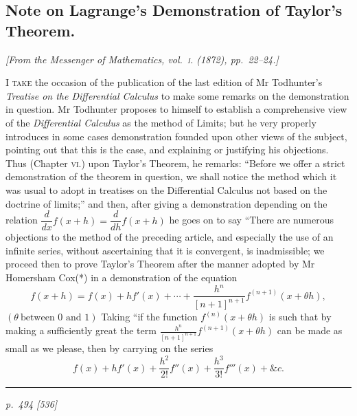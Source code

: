 \documentclass[11pt,a4paper]{article}
\theoremstyle{plain}
\theoremstyle{definition}
\begin{document}
\subsection{Note on Lagrange's Demonstration of Taylor's Theorem.}

\begin{center}
\textit{[From the Messenger of Mathematics, vol.~\textsc{i}. (1872), pp.~22--24.]}
\end{center}

\noindent\textsc{I take} the occasion of the publication of the last edition of Mr Todhunter's
\textit{Treatise on the Differential Calculus} to make some remarks on the demonstration in
question. Mr Todhunter proposes to himself to establish a comprehensive view of the
\textit{Differential Calculus} as the method of Limits; but he very properly introduces in some
cases demonstration founded upon other views of the subject, pointing out that this
is the case, and explaining or justifying his objections. Thus (Chapter \textsc{vi}.) upon
Taylor's Theorem, he remarks: ``Before we offer a strict demonstration of the theorem
in question, we shall notice the method which it was usual to adopt in treatises on
the Differential Calculus not based on the doctrine of limits;'' and then, after giving
a demonstration depending on the relation $\dfrac{d}{dx}f(x + h) = \dfrac{d}{dh}f(x + h)$ he goes on to
say ``There are numerous objections to the method of the preceding article, and especially
the use of an infinite series, without ascertaining that it is convergent, is inadmissible;
we proceed then to prove Taylor's Theorem after the manner adopted by Mr Homersham
Cox(*) in a demonstration of the equation
\[
f(x + h) = f(x) + hf'(x) + \cdots + \frac{h^n}{[n+1]^{n+1}}f^{(n+1)}(x + \theta h),
\]
$(\theta\ \text{between } 0 \text{ and } 1)$ Taking ``if the function $f^{(n)}(x + \theta h)$ is such that by making a
sufficiently great the term $\frac{h^n}{[n+1]^{n+1}}f^{(n+1)}(x + \theta h)$ can be made as small as we please, then
by carrying on the series
\[
f(x) + hf'(x) + \frac{h^2}{2!}f''(x) + \frac{h^3}{3!}f'''(x) + \&c.
\]
\smallskip
\noindent\rule{0.45\textwidth}{0.4pt}

\clearpage

\bigskip
\textit{p.~494 [536]}
\smallskip
\end{document}
